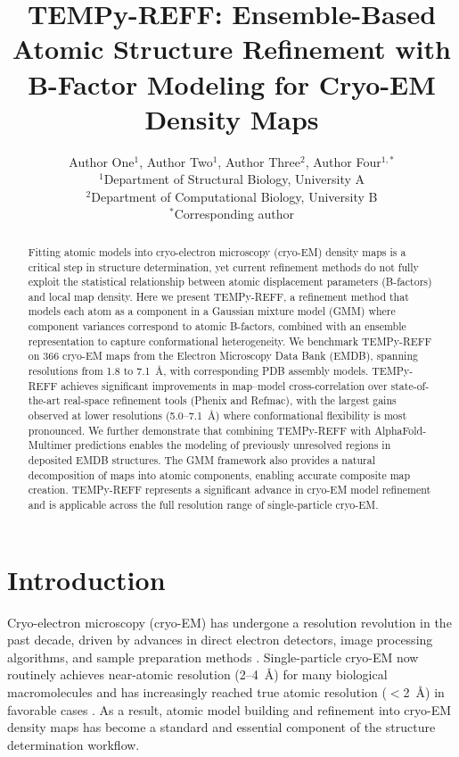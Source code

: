 \documentclass[11pt]{article}
\title{TEMPy-REFF: Ensemble-Based Atomic Structure Refinement with B-Factor Modeling for Cryo-EM Density Maps}
\author{
  Author One$^{1}$, Author Two$^{1}$, Author Three$^{2}$, Author Four$^{1,*}$ \\
  $^{1}$Department of Structural Biology, University A \\
  $^{2}$Department of Computational Biology, University B \\
  $^{*}$Corresponding author
}
\date{}
\begin{document}
\maketitle

\begin{abstract}
Fitting atomic models into cryo-electron microscopy (cryo-EM) density maps is a critical step in structure determination, yet current refinement methods do not fully exploit the statistical relationship between atomic displacement parameters (B-factors) and local map density. Here we present TEMPy-REFF, a refinement method that models each atom as a component in a Gaussian mixture model (GMM) where component variances correspond to atomic B-factors, combined with an ensemble representation to capture conformational heterogeneity. We benchmark TEMPy-REFF on 366 cryo-EM maps from the Electron Microscopy Data Bank (EMDB), spanning resolutions from 1.8 to 7.1~\AA{}, with corresponding PDB assembly models. TEMPy-REFF achieves significant improvements in map--model cross-correlation over state-of-the-art real-space refinement tools (Phenix and Refmac), with the largest gains observed at lower resolutions (5.0--7.1~\AA{}) where conformational flexibility is most pronounced. We further demonstrate that combining TEMPy-REFF with AlphaFold-Multimer predictions enables the modeling of previously unresolved regions in deposited EMDB structures. The GMM framework also provides a natural decomposition of maps into atomic components, enabling accurate composite map creation. TEMPy-REFF represents a significant advance in cryo-EM model refinement and is applicable across the full resolution range of single-particle cryo-EM.
\end{abstract}

\section{Introduction}

Cryo-electron microscopy (cryo-EM) has undergone a resolution revolution in the past decade, driven by advances in direct electron detectors, image processing algorithms, and sample preparation methods \citep{kuhlbrandt2014,cheng2015,nakane2020}. Single-particle cryo-EM now routinely achieves near-atomic resolution (2--4~\AA{}) for many biological macromolecules and has increasingly reached true atomic resolution ($<$2~\AA{}) in favorable cases \citep{yip2020,nakane2020}. As a result, atomic model building and refinement into cryo-EM density maps has become a standard and essential component of the structure determination workflow.
\end{document}
